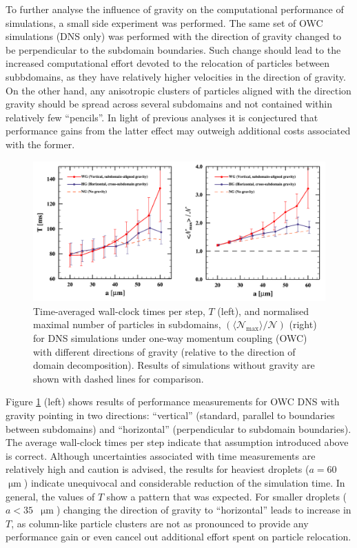 \documentclass{pracamgren}
\begin{document}
\medskip

To further analyse the influence of gravity on the computational performance of simulations, a small side experiment was performed.
The same set of OWC simulations (DNS only) was performed with the direction of gravity changed to be perpendicular to the subdomain boundaries.
Such change should lead to the increased computational effort devoted to the relocation of particles between subbdomains, as they have relatively higher velocities in the direction of gravity.
On the other hand, any anisotropic clusters of particles aligned with the direction gravity should be spread across several subdomains and not contained within relatively few ``pencils''.
In light of previous analyses it is conjectured that performance gains from the latter effect may outweigh additional costs associated with the former.

\begin{figure}[h]
\centering
\includegraphics[width=13.5cm]{figures/3-21_howcperf.pdf}
\caption{
Time-averaged wall-clock times per step, $T$ (left), and normalised maximal number of particles in subdomains, $(\langle \mathcal{N}_{\max} \rangle / \mathcal{N})$ (right) for DNS simulations under one-way momentum coupling (OWC) with different directions of gravity (relative to the direction of domain decomposition).
Results of simulations without gravity are shown with dashed lines for comparison. 
}
\label{fig:howcperf}
\end{figure}

Figure \ref{fig:howcperf} (left) shows results of performance measurements for OWC DNS with gravity pointing in two directions: ``vertical'' (standard, parallel to boundaries between subdomains) and ``horizontal'' (perpendicular to subdomain boundaries).
The average wall-clock times per step indicate that assumption introduced above is correct.
Although uncertainties associated with time measurements are relatively high and caution is advised, the results for heaviest droplets ($a = 60$~$\upmu\text{m}$) indicate unequivocal and considerable reduction of the simulation time.
In general, the values of $T$ show a pattern that was expected.
For smaller droplets ($a < 35$~$\upmu\text{m}$) changing the direction of gravity to ``horizontal'' leads to increase in $T$, as column-like particle clusters are not as pronounced to provide any performance gain or even cancel out additional effort spent on particle relocation.   
\end{document}
